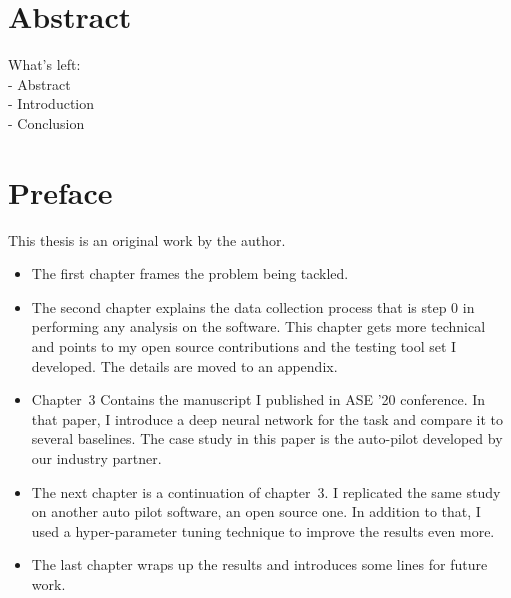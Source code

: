 
\chapter{Abstract}
What's left: \\
- Abstract \\
- Introduction \\
- Conclusion \\

\chapter{Preface}

This thesis is an original work by the author. 
\begin{itemize}
    \item The first chapter frames the problem being tackled. 
    \item The second chapter explains the data collection process that is step 0 in performing any analysis on the software. This chapter gets more technical and points to my open source contributions and the testing tool set I developed.%
    The details are moved to an appendix.
    \item Chapter~3 Contains the manuscript I published in ASE '20 conference. In that paper, I introduce a deep neural network for the task and compare it to several baselines. The case study in this paper is the auto-pilot developed by our industry partner.
    \item The next chapter is a continuation of chapter~3. I replicated the same study on another auto pilot software, an open source one. In addition to that, I used a hyper-parameter tuning technique to improve the results even more.
    \item The last chapter wraps up the results and introduces some lines for future work.
\end{itemize}


\dedication{To the ones who made this a smoother journey.} 

\tableofcontents


\listoftables


\listoffigures

